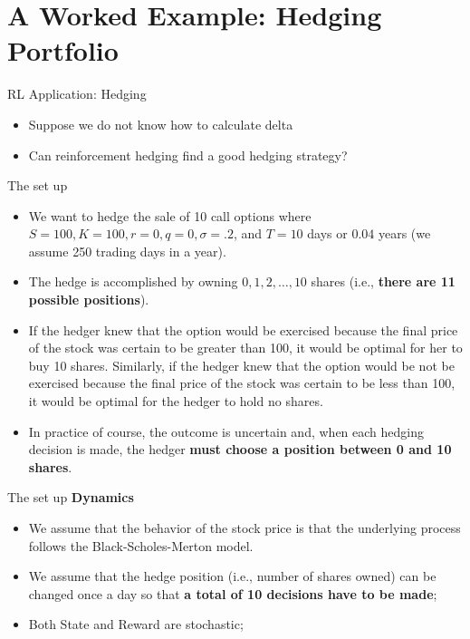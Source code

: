 \documentclass[11pt]{beamer}
\begin{document}
\section{A Worked Example: Hedging Portfolio}
\begin{frame}{RL Application: Hedging}
	\begin{itemize}
		\item Suppose we do not know how to calculate delta
		\item Can reinforcement hedging find a good hedging strategy?
	\end{itemize}
\end{frame}
\begin{frame}{The set up }
	\begin{itemize}
		\item We want to hedge the sale of 10 call options where $S = 100, K = 100, r = 0, q = 0, \sigma= .2$, and $T = 10$ days or $0.04$ years (we assume 250 trading days in a year).
		\item The hedge is accomplished by owning $0, 1, 2,\dots, 10$ shares (i.e., \textbf{there are 11 possible positions}). 
		\item If the hedger knew that the option would be exercised because the final price of the stock was certain to be greater than 100, it would be optimal for her to buy 10 shares. Similarly, if the hedger knew that the option would be not be exercised because the final price of the stock was certain to be less than 100, it would be optimal for the hedger to hold no shares. 
		\item In practice of course, the outcome is uncertain and, when each hedging decision is made, the hedger \textbf{must choose a position between 0 and 10 shares}.
	\end{itemize}
\end{frame}
\begin{frame}{The set up }
\textbf{Dynamics}\\
\vspace{0.5cm}
	\begin{itemize}
		\item We assume that the behavior of the stock price is that the underlying process follows the Black-Scholes-Merton model.
		\item We assume that the hedge position (i.e., number of shares owned) can be changed once a day so that \textbf{a total of 10 decisions have to be made};
\item Both State and Reward are stochastic;
\end{itemize}
\end{frame}
\end{document}

